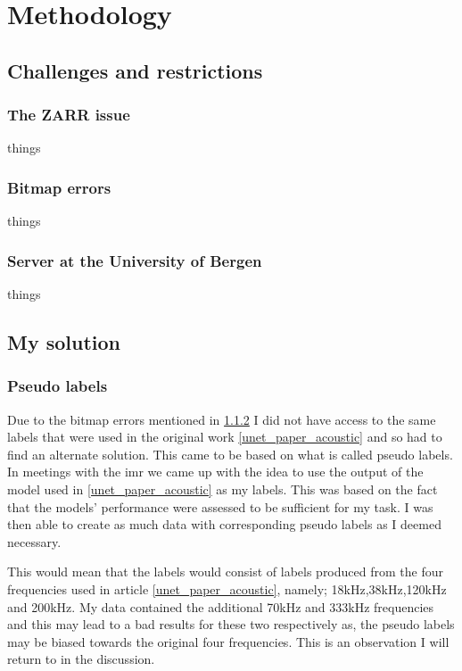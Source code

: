 \chapter{Methodology}
\section{Challenges and restrictions}
    \subsection{The ZARR issue}
        things
    \subsection{Bitmap errors} \label{bitmap_error}
        things
        
    \subsection{Server at the University of Bergen}
        things
        
    

\section{My solution}
    \subsection{Pseudo labels} \label{Pseudo label}
        Due to the bitmap errors mentioned in \ref{bitmap_error} I did not have access to the same labels that were used in the original work \ref{unet_paper_acoustic} and so had to find an alternate solution. This came to be based on what is called pseudo labels. In meetings with the \gls{imr} we came up with the idea to use the output of the model used in \ref{unet_paper_acoustic} as my labels. This was based on the fact that the models' performance were assessed to be sufficient for my task. I was then able to create as much data with corresponding pseudo labels as I deemed necessary.
        
        This would mean that the labels would consist of labels produced from the four frequencies used in article \ref{unet_paper_acoustic}, namely; 18kHz,38kHz,120kHz and 200kHz. My data contained the additional 70kHz and 333kHz frequencies and this may lead to a bad results for these two respectively as, the pseudo labels may be biased towards the original four frequencies. This is an observation I will return to in the discussion. 
        

